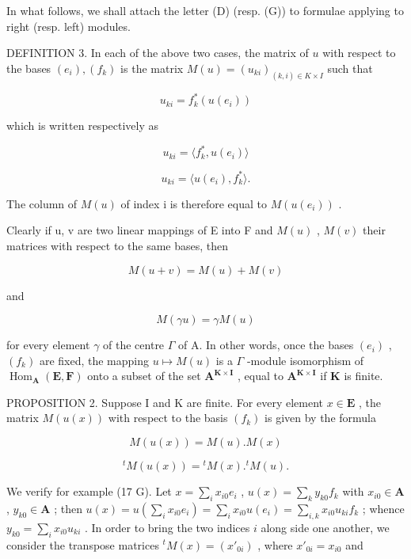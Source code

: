 In what follows, we shall attach the letter (D) (resp. (G)) to formulae applying to right (resp. left) modules.

DEFINITION 3. In each of the above two cases, the matrix of \(u\) with respect to the bases \((e_i), (f_k)\) is the matrix \(M(u) = (u_{ki})_{(k,i) \in K \times I}\) such that

\[
u _ {k i} = f _ {k} ^ {*} (u (e _ {i}))\tag{14}
\]

which is written respectively as

\[
u _ {k i} = \langle f _ {k} ^ {*}, u (e _ {i}) \rangle\tag{14 D}
\]

\[
u _ {k i} = \langle u (e _ {i}), f _ {k} ^ {*} \rangle .\tag{14 G}
\]

The column of \(M(u)\) of index i is therefore equal to \(M(u(e_{i}))\) .

Clearly if u, v are two linear mappings of E into F and \(M(u)\) , \(M(v)\) their matrices with respect to the same bases, then

\[
M (u + v) = M (u) + M (v)\tag{15}
\]

and

\[
M (\gamma u) = \gamma M (u)\tag{16}
\]

for every element \(\gamma\) of the centre \(\Gamma\) of A. In other words, once the bases \((e_i)\) , \((f_k)\) are fixed, the mapping \(u \mapsto M(u)\) is a \(\Gamma\) -module isomorphism of \(\operatorname{Hom}_{\mathbf{A}}(\mathbf{E}, \mathbf{F})\) onto a subset of the set \(\mathbf{A}^{\mathbf{K} \times \mathbf{I}}\) , equal to \(\mathbf{A}^{\mathbf{K} \times \mathbf{I}}\) if \(\mathbf{K}\) is finite.

PROPOSITION 2. Suppose I and K are finite. For every element \(x \in \mathbf{E}\) , the matrix \(M(u(x))\) with respect to the basis \((f_k)\) is given by the formula

\[
M (u (x)) = M (u). M (x)\tag{17 D}
\]

\[
{ } ^ { t } M ( u ( x ) ) = { } ^ { t } M ( x ) . { } ^ { t } M ( u ) .\tag{17 G}
\]

We verify for example (17 G). Let \(x = \sum_{i} x_{i0} e_i\) , \(u(x) = \sum_{k} y_{k0} f_k\) with \(x_{i0} \in \mathbf{A}\) , \(y_{k0} \in \mathbf{A}\) ; then \(u(x) = u\left(\sum_{i} x_{i0} e_i\right) = \sum_{i} x_{i0} u(e_i) = \sum_{i, k} x_{i0} u_{ki} f_k\) ; whence \(y_{k0} = \sum_{i} x_{i0} u_{ki}\) . In order to bring the two indices \(i\) along side one another, we consider the transpose matrices \(^t M(x) = (x'_{0i})\) , where \(x'_{0i} = x_{i0}\) and

